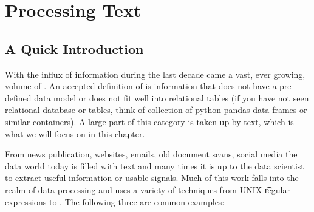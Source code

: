 \chapter[Processing Text]{Processing Text} 
\label{chapter:nlptext}
\begin{center}
\end{center}
\vspace{0.2in}


\section{A Quick Introduction}


With the influx of information during the last decade came a vast, ever growing, volume of . An accepted definition of  is information that does not have a pre-defined data model or does not fit well into relational tables (if you have not seen relational database or tables, think of collection of python pandas data frames or similar containers). A large part of this category is taken up by text, which is what we will focus on in this chapter. 


From news publication, websites, emails, old document scans, social media the data world today is filled with text and many times it is up to the data scientist to extract useful information or usable signals. Much of this work falls into the realm of data processing and uses a variety of techniques from UNIX \t{regular expressions} to . The following three are common examples: 

